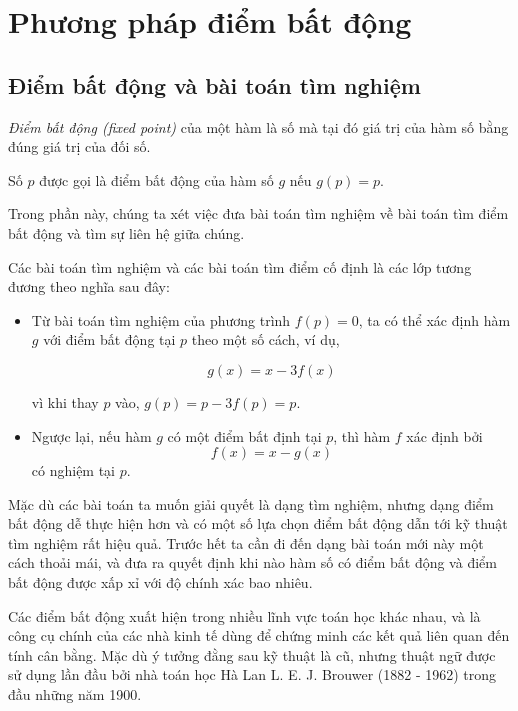 \documentclass[../../Lectures.tex]{subfiles}
\begin{document}

\section{Phương pháp điểm bất động}

\subsection{Điểm bất động và bài toán tìm nghiệm}

\emph{Điểm bất động (fixed point)} của một hàm là số mà tại đó giá trị của hàm
số bằng đúng giá trị của đối số.

\begin{definition}
    Số \(p\) được gọi là điểm bất động của hàm số \(g\) nếu \(g(p) = p\).
\end{definition}

Trong phần này, chúng ta xét việc đưa bài toán tìm nghiệm về bài toán tìm điểm
bất động và tìm sự liên hệ giữa chúng.

Các bài toán tìm nghiệm và các bài toán tìm điểm cố định là các lớp tương đương
theo nghĩa sau đây:
\begin{itemize}
    \item Từ bài toán tìm nghiệm của phương trình \(f(p) = 0\), ta có thể xác
        định hàm \(g\) với điểm bất động tại \(p\) theo một số cách, ví dụ,

        \[g(x) = x - 3f(x)\]

        vì khi thay \(p\) vào, \(g(p) = p - 3f(p) = p\).

    \item Ngược lại, nếu hàm \(g\) có một điểm bất định tại \(p\), thì hàm \(f\)
        xác định bởi \[f(x) = x - g(x)\] có nghiệm tại \(p\).
\end{itemize}

Mặc dù các bài toán ta muốn giải quyết là dạng tìm nghiệm, nhưng dạng điểm bất
động dễ thực hiện hơn và có một số lựa chọn điểm bất động dẫn tới kỹ thuật tìm
nghiệm rất hiệu quả. Trước hết ta cần đi đến dạng bài toán mới này một cách
thoải mái, và đưa ra quyết định khi nào hàm số có điểm bất động và điểm bất động
được xấp xỉ với độ chính xác bao nhiêu.

Các điểm bất động xuất hiện trong nhiều lĩnh vực toán học khác nhau, và là công
cụ chính của các nhà kinh tế dùng để chứng minh các kết quả liên quan đến tính
cân bằng. Mặc dù ý tưởng đằng sau kỹ thuật là cũ, nhưng thuật ngữ được sử dụng
lần đầu bởi nhà toán học Hà Lan L. E. J. Brouwer (1882 - 1962) trong đầu những
năm 1900.
\end{document}
